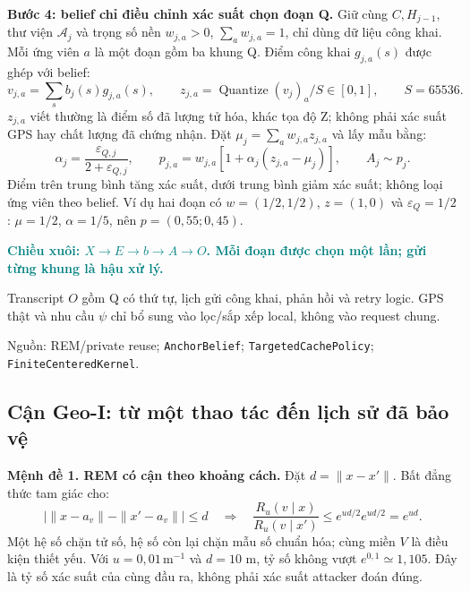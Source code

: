 \documentclass[10pt,a4paper]{article}
\newcommand{\key}[1]{\par\smallskip\noindent\textcolor{teal}{\textbf{#1}}\par\smallskip}
\newcommand{\source}[1]{\par{\footnotesize\color{gray}Nguồn: #1}\par}
\begin{document}
\textbf{Bước 4: belief chỉ điều chỉnh xác suất chọn đoạn Q.} Giữ cùng $C,H_{j-1}$, thư viện
$\mathcal A_j$ và trọng số nền $w_{j,a}>0$, $\sum_aw_{j,a}=1$, chỉ dùng dữ liệu công khai.
Mỗi ứng viên $a$ là một đoạn gồm ba khung Q. Điểm công khai $g_{j,a}(s)$ được ghép với belief:
\begin{equation}
v_{j,a}=\sum_s b_j(s)g_{j,a}(s),\qquad
z_{j,a}=\operatorname{Quantize}(v_j)_a/S\in[0,1],\qquad S=65536.
\label{eq:score}
\end{equation}
$z_{j,a}$ viết thường là điểm số đã lượng tử hóa, khác tọa độ Z; không phải xác suất GPS hay chất lượng đã chứng nhận.
Đặt $\mu_j=\sum_aw_{j,a}z_{j,a}$ và lấy mẫu bằng:
\begin{equation}
\alpha_j=\frac{\varepsilon_{Q,j}}{2+\varepsilon_{Q,j}},\qquad
p_{j,a}=w_{j,a}[1+\alpha_j(z_{j,a}-\mu_j)],\qquad A_j\sim p_j.
\label{eq:q}
\end{equation}
Điểm trên trung bình tăng xác suất, dưới trung bình giảm xác suất; không loại ứng viên theo belief.
Ví dụ hai đoạn có $w=(1/2,1/2)$, $z=(1,0)$ và $\varepsilon_Q=1/2$:
$\mu=1/2$, $\alpha=1/5$, nên $p=(0{,}55;0{,}45)$.

\key{Chiều xuôi: $X\to E\to b\to A\to O$. Mỗi đoạn được chọn một lần; gửi từng khung là hậu xử lý.}
Transcript $O$ gồm Q có thứ tự, lịch gửi công khai, phản hồi và retry logic.
GPS thật và nhu cầu $\psi$ chỉ bổ sung vào lọc/sắp xếp local, không vào request chung.
\source{REM/private reuse; \texttt{AnchorBelief}; \texttt{TargetedCachePolicy}; \texttt{FiniteCenteredKernel}.}

\clearpage
\subsection{Cận Geo-I: từ một thao tác đến lịch sử đã bảo vệ}
\textbf{Mệnh đề 1. REM có cận theo khoảng cách.} Đặt $d=\|x-x'\|$. Bất đẳng thức tam giác cho:
\begin{equation}
\big|\|x-a_v\|-\|x'-a_v\|\big|\le d
\quad\Longrightarrow\quad
\frac{R_u(v\mid x)}{R_u(v\mid x')}\le e^{ud/2}e^{ud/2}=e^{ud}.
\label{eq:remproof}
\end{equation}
Một hệ số chặn tử số, hệ số còn lại chặn mẫu số chuẩn hóa; cùng miền $V$ là điều kiện thiết yếu.
Với $u=0{,}01\,\mathrm m^{-1}$ và $d=10$ m, tỷ số không vượt $e^{0{,}1}\simeq1{,}105$.
Đây là tỷ số xác suất của cùng đầu ra, không phải xác suất attacker đoán đúng.
\end{document}
